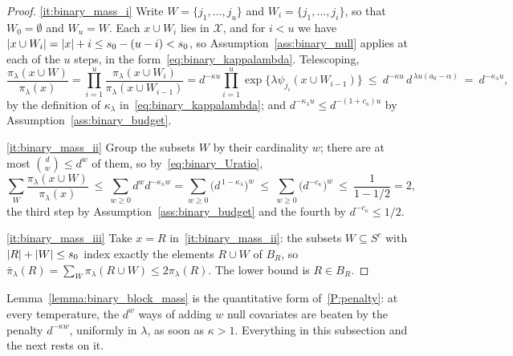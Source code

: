 \documentclass[aos]{imsart}%
\DeclarePairedDelimiter{\abs}{\lvert}{\rvert}
\newcommand{\ambientspace}[0]{\mathcal{X}}
\theoremstyle{plain}
\theoremstyle{definition}
\begin{document}
    \begin{proof}
        \ref{it:binary_mass_i} Write $W=\{j_1,\dots,j_u\}$ and
        $W_i=\{j_1,\dots,j_i\}$, so that $W_0=\emptyset$ and $W_u=W$. Each
        $x\cup W_i$ lies in $\ambientspace$, and for $i<u$ we have
        $\abs{x\cup W_i}=\abs x+i\leq s_0-(u-i)<s_0$, so
        Assumption~\ref{ass:binary_null} applies at each of the $u$ steps, in
        the form~\eqref{eq:binary_kappalambda}. Telescoping,
        \begin{equation*}
            \frac{\pi_\lambda(x\cup W)}{\pi_\lambda(x)}
            =\prod_{i=1}^{u}\frac{\pi_\lambda(x\cup W_i)}{\pi_\lambda(x\cup
            W_{i-1})}
            =d^{-\kappa u}\prod_{i=1}^{u}
            \exp\bigl\{\lambda\psi_{j_i}(x\cup W_{i-1})\bigr\}
            \ \leq\ d^{-\kappa u}\,d^{\,\lambda u(a_0-\alpha)}
            \ =\ d^{-\kappa_\lambda u},
        \end{equation*}
        by the definition of $\kappa_\lambda$
        in~\eqref{eq:binary_kappalambda}; and
        $d^{-\kappa_\lambda u}\leq d^{-(1+c_\kappa)u}$ by
        Assumption~\ref{ass:binary_budget}.

        \ref{it:binary_mass_ii} Group the subsets $W$ by their cardinality $w$;
        there are at most $\binom{d}{w}\leq d^{w}$ of them, so
        by~\eqref{eq:binary_Uratio},
        \begin{equation*}
            \sum_{W}\frac{\pi_\lambda(x\cup W)}{\pi_\lambda(x)}
            \ \leq\ \sum_{w\geq0}d^{w}d^{-\kappa_\lambda w}
            =\sum_{w\geq0}\bigl(d^{\,1-\kappa_\lambda}\bigr)^{w}
            \ \leq\ \sum_{w\geq0}\bigl(d^{-c_\kappa}\bigr)^{w}
            \ \leq\ \frac{1}{1-1/2}=2 ,
        \end{equation*}
        the third step by Assumption~\ref{ass:binary_budget} and the fourth by
        $d^{-c_\kappa}\leq1/2$.

        \ref{it:binary_mass_iii} Take $x=R$ in~\ref{it:binary_mass_ii}: the
        subsets $W\subseteq S^{c}$ with $\abs R+\abs W\leq s_0$ index exactly
        the elements $R\cup W$ of $B_R$, so
        $\bar\pi_\lambda(R)=\sum_W\pi_\lambda(R\cup W)\leq2\pi_\lambda(R)$. The
        lower bound is $R\in B_R$.
    \end{proof}

    Lemma~\ref{lemma:binary_block_mass} is the quantitative form
    of~\ref{P:penalty}: at every temperature, the $d^{w}$ ways of adding $w$
    null covariates are beaten by the penalty $d^{-\kappa w}$, uniformly in
    $\lambda$, as soon as $\kappa>1$. Everything in this subsection and the
    next rests on it.
\end{document}
